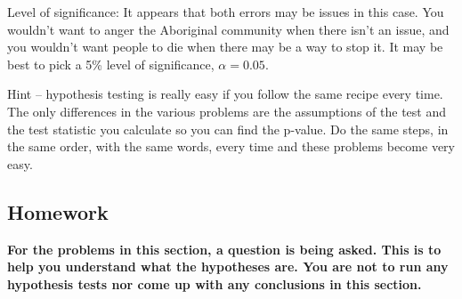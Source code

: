 \documentclass[
]{book}
\begin{document}
Level of significance: It appears that both errors may be issues in this case. You wouldn't want to anger the Aboriginal community when there isn't an issue, and you wouldn't want people to die when there may be a way to stop it. It may be best to pick a 5\% level of significance, \(\alpha=0.05\).

Hint -- hypothesis testing is really easy if you follow the same recipe every time. The only differences in the various problems are the assumptions of the test and the test statistic you calculate so you can find the p-value. Do the same steps, in the same order, with the same words, every time and these problems become very easy.

\hypertarget{homework}{%
\subsection{Homework}\label{homework}}

\textbf{For the problems in this section, a question is being asked. This is to help you understand what the hypotheses are. You are not to run any hypothesis tests nor come up with any conclusions in this section.}
\end{document}

